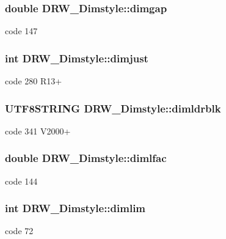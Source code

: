 \subsubsection[{dimgap}]{\setlength{\rightskip}{0pt plus 5cm}double D\+R\+W\+\_\+\+Dimstyle\+::dimgap}\label{class_d_r_w___dimstyle_af258a983498f66472b6c5b51d368980b}
code 147 \hypertarget{class_d_r_w___dimstyle_a065205dcc5446262657b612353aa3deb}{}
\subsubsection[{dimjust}]{\setlength{\rightskip}{0pt plus 5cm}int D\+R\+W\+\_\+\+Dimstyle\+::dimjust}\label{class_d_r_w___dimstyle_a065205dcc5446262657b612353aa3deb}
code 280 R13+ \hypertarget{class_d_r_w___dimstyle_a975377a787e4ca8a515f20f277d7a805}{}
\subsubsection[{dimldrblk}]{\setlength{\rightskip}{0pt plus 5cm}U\+T\+F8\+S\+T\+R\+I\+N\+G D\+R\+W\+\_\+\+Dimstyle\+::dimldrblk}\label{class_d_r_w___dimstyle_a975377a787e4ca8a515f20f277d7a805}
code 341 V2000+ \hypertarget{class_d_r_w___dimstyle_ac74c4cc07bf6edde4b563d8f5fb03d8e}{}
\subsubsection[{dimlfac}]{\setlength{\rightskip}{0pt plus 5cm}double D\+R\+W\+\_\+\+Dimstyle\+::dimlfac}\label{class_d_r_w___dimstyle_ac74c4cc07bf6edde4b563d8f5fb03d8e}
code 144 \hypertarget{class_d_r_w___dimstyle_ae5324505be40acd3ed0450d39d3bd120}{}
\subsubsection[{dimlim}]{\setlength{\rightskip}{0pt plus 5cm}int D\+R\+W\+\_\+\+Dimstyle\+::dimlim}\label{class_d_r_w___dimstyle_ae5324505be40acd3ed0450d39d3bd120}
code 72 \hypertarget{class_d_r_w___dimstyle_a3e2bc803306737f75c7a0390c0dbc5cd}{}
